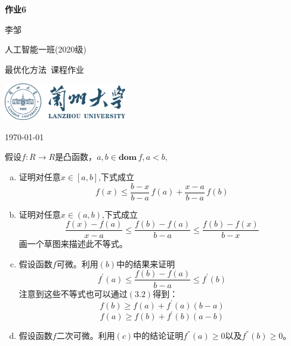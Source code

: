 \documentclass[10pt, a4paper]{article}
\newcommand\course{最优化方法}                         %
\begin{document}
\begin{titlepage}
    \begin{center}
        \vspace*{3.5cm}
            
        \Huge
        \textbf{作业6}
            
        \vspace{2cm}
        \LARGE
        李邹
            
        \vspace{0.1cm}
        \Large
        人工智能一班(2020级)                      %
        
            
        \vfill
        
        \course \ 课程作业
            
        \vspace{1cm}
            
        \includegraphics[width=0.4\textwidth]{lzu-logo.png}
        \\
        
        \Large
        
        \today
            
    \end{center}
\end{titlepage}


\newpage
\begin{Problem}
假设$f:R\longrightarrow R$是凸函数，$a,b\in \textbf{dom}\,f,a<b,$
\begin{enumerate}[(a)]
	\item 证明对任意$x\in \left [ a,b \right ] $,下式成立
    \[f\left ( x \right ) \le \frac{b-x}{b-a} \, f\left ( a \right ) +\frac{x-a}{b-a} \, f\left ( b \right ) \]
	\item 证明对任意$x\in \left ( a,b \right ) $,下式成立
    \[\frac{f(x)-f(a)}{x-a} \le \frac{f(b)-f(a)}{b-a}\le \frac{f(b)-f(x)}{b-x}  \]
    画一个草图来描述此不等式。
	\item 假设函数$f$可微。利用$(b)$中的结果来证明
    \[f^{\prime}(a) \leq \frac{f(b)-f(a)}{b-a} \leq f^{\prime}(b)\]
    注意到这些不等式也可以通过$(3.2)$得到：
    \[f(b) \geq f(a)+f^{\prime}(a)(b-a)\]\[f(a) \geq f(b)+f^{\prime}(b)(a-b)\]
	\item 假设函数$f$二次可微。利用$(c)$中的结论证明$f^{''}(a)\ge 0 $以及$f^{''}(b)\ge 0$。
\end{enumerate}
\end{Problem}
    
\end{document}
